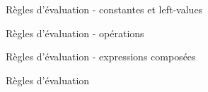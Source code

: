 \begin{figure}

\begin{mathpar}







\end{mathpar}

\caption{Règles d'évaluation - constantes et left-values}
\end{figure}

\begin{figure}

\begin{mathpar}





\end{mathpar}

\caption{Règles d'évaluation - opérations}
\end{figure}

\begin{figure}

\begin{mathpar}



\end{mathpar}

\caption{Règles d'évaluation - expressions composées}
\end{figure}

\begin{figure}

\begin{mathpar}











\end{mathpar}

\caption{Règles d'évaluation}
\end{figure}
